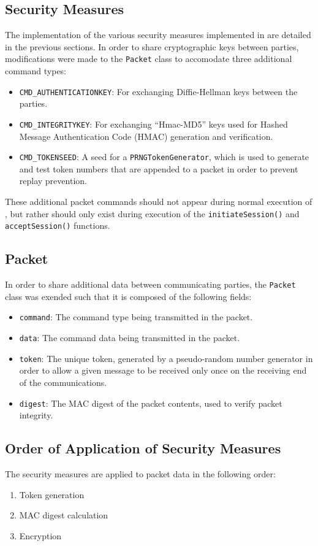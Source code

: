 \documentclass[a4paper,11pt]{article}
\begin{document}
\subsection{Security Measures}
The implementation of the various security measures implemented in 
\packageName{} are detailed in the previous sections. In order to share
cryptographic keys between parties, modifications were made to the 
\packageName{} \verb+Packet+ class to accomodate three additional command types:
\begin{itemize}
\item \verb+CMD_AUTHENTICATIONKEY+: For exchanging Diffie-Hellman keys
between the parties.
\item \verb+CMD_INTEGRITYKEY+: For exchanging ``Hmac-MD5'' keys used 
for Hashed Message Authentication Code (HMAC) generation and verification.
\item \verb+CMD_TOKENSEED+: A seed for a \verb+PRNGTokenGenerator+, 
which is used to generate and test token numbers that are appended to a packet
in order to prevent replay prevention.
\end{itemize}

These additional packet commands should not appear during normal execution of 
\serviceName{}, but rather should only exist during execution of the
\verb+initiateSession()+ and \verb+acceptSession()+ functions.

\subsection{Packet}
In order to share additional data between communicating parties, the 
\serviceName{} \verb+Packet+ class was exended such that it is composed of the
following fields:
\begin{itemize}
\item \verb+command+: The command type being transmitted in the 
packet.
\item \verb+data+: The command data being transmitted in the packet.
\item \verb+token+: The unique token, generated by a pseudo-random
number generator in order to allow a given message to be received only once on 
the receiving end of the communications.
\item \verb+digest+: The MAC digest of the packet contents, used to 
verify packet integrity.
\end{itemize}

\subsection{Order of Application of Security Measures}
The security measures are applied to packet data in the following order:
\begin{enumerate}
\item Token generation
\item MAC digest calculation
\item Encryption
\end{enumerate}
\end{document}
